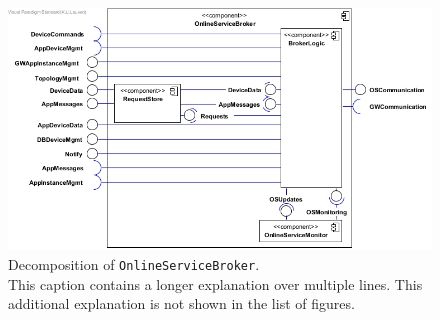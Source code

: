 \begin{figure}[!htp]
	\centering
	\includegraphics[width=\textwidth]{images/component-diagram-OnlineServiceBroker}
	\caption[Decomposition of \texttt{OnlineServiceBroker}]{Decomposition of \texttt{OnlineServiceBroker}.\\
	This caption contains a longer explanation over multiple lines. This additional explanation is not shown in the list of figures.}\label{fig:decomp-component4}
\end{figure}

